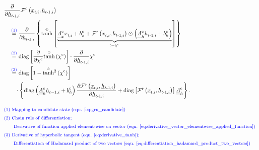 \begin{align} \label{eq:gru_grad_candidate_2_previous_hidden}
    &\frac{\partial}{\partial \underline h_{t\text{-}1, i}}
    \mathcal{F}^\text{c}\left(\underline x_{t, i}, \underline h_{t\text -1, i}\right)
    \nonumber \\ & \quad \overset{\textcolor{blue}{(1)}}{=}
    \frac{\partial}{\partial \underline h_{t\text{-}1, i}}
    \left\{
        \overset{\scriptscriptstyle \odot}{\tanh} \left[
            \underbrace{
            \underline{\underline A}^\text{c}_{x}
            \underline x_{t,i}
            +
            \underline b^\text{c}_{x}
            +
            \mathcal{F}^\text{r}\left(\underline x_{t, i}, \underline h_{t\text -1, i}\right)
            \odot
            \left(
                \underline{\underline A}^\text{c}_{h}
                \underline h_{t\text -1,i}
                +
                \underline b^\text{c}_{h}
            \right)}_{:=\chi^\text{c}}
        \right]
    \right\}
    \nonumber \\ & \quad \overset{\textcolor{blue}{(2)}}{=}
    \mathrm{diag} \left[
        \frac{\partial}{\partial \chi^\text{c}}
        \overset{\scriptscriptstyle \odot}{\tanh} \left(\chi^\text{c}\right)
    \right] 
    \cdot 
    \frac{\partial}{\partial \underline h_{t\text{-}1, i}} \chi^\text{c}
    \nonumber \\ & \quad \overset{\textcolor{blue}{(3)}}{=}
    \mathrm{diag} \left[
        1 - \overset{\scriptscriptstyle \odot}{\tanh}{}^2 \left(\chi^\text{c}\right)
    \right] 
    \nonumber \\ &\quad \quad  \cdot
    \left\{
        \mathrm{diag} \left(
            \underline{\underline A}^\text{c}_{h}
            \underline h_{t-1,i}
            +
            \underline b^\text{c}_{h}
        \right)
        \frac{\partial \mathcal{F}^\text{r}\left(\underline x_{t, i}, \underline h_{t\text -1, i}\right)}
        {\partial \underline h_{t\text -1, i}}
        +
        \mathrm{diag}\left[
            \mathcal{F}^\text{r}\left(\underline x_{t, i}, \underline h_{t\text -1, i}\right)
        \right]
        \underline{\underline A}^\text{c}_{h}
    \right\}.
    \\[2ex]
        &\textcolor{blue}{\text{\footnotesize (1)
            Mapping to candidate state (equ. \ref{eq:gru_candidate})
        }} \nonumber \\
        &\textcolor{blue}{\text{\footnotesize (2) 
            Chain rule of differentiation;  
        }} \nonumber \\
        &\textcolor{blue}{\text{\footnotesize \qquad 
            Derivative of function applied element-wise on vector
            (equ. \ref{eq:derivative_vector_elementwise_applied_function})
        }} \nonumber \\
        &\textcolor{blue}{\text{\footnotesize (3) 
            Derivative of hyperbolic tangent (equ. \ref{eq:derivative_tanh}); 
        }} \nonumber \\
        &\textcolor{blue}{\text{\footnotesize \qquad
            Differentiation of Hadamard product of two vectors 
            (equ. \ref{eq:differentiation_hadamard_product_two_vectors})
        }} \nonumber
\end{align}
